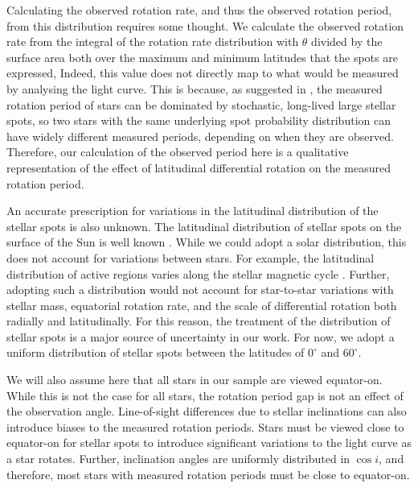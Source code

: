 Calculating the observed rotation rate, and thus the observed rotation period, from this distribution requires some thought.
We calculate the observed rotation rate from the integral of the rotation rate distribution with $\theta$ divided by the surface area both over the maximum and minimum latitudes that the spots are expressed,
Indeed, this value does not directly map to what would be measured by analysing the light curve. 
This is because, as suggested in \citet{aigrain_hare_2015}, the measured rotation period of stars can be dominated by stochastic, long-lived large stellar spots, so two stars with the same underlying spot probability distribution can have widely different measured periods, depending on when they are observed.
Therefore, our calculation of the observed period here is a qualitative representation of the effect of latitudinal differential rotation on the measured rotation period.

An accurate prescription for variations in the latitudinal distribution of the stellar spots is also unknown.
The latitudinal distribution of stellar spots on the surface of the Sun is well known \citep[see, e.g.,][]{maunder_note_1904,hathaway_solar_2015}.
While we could adopt a solar distribution, this does not account for variations between stars.
For example, the latitudinal distribution of active regions varies along the stellar magnetic cycle \citep[see, e.g.,][ and references therein]{grijs_stellar_2021}.
Further, adopting such a distribution would not account for star-to-star variations with stellar mass, equatorial rotation rate, and the scale of differential rotation both radially and latitudinally.
For this reason, the treatment of the distribution of stellar spots is a major source of uncertainty in our work.
For now, we adopt a uniform distribution of stellar spots between the latitudes of $0^{\circ}$ and $60^{\circ}$.

We will also assume here that all stars in our sample are viewed equator-on.
While this is not the case for all stars, the rotation period gap is not an effect of the observation angle.
Line-of-sight differences due to stellar inclinations can also introduce biases to the measured rotation periods.
Stars must be viewed close to equator-on for stellar spots to introduce significant variations to the light curve as a star rotates.
Further, inclination angles are uniformly distributed in $\cos{i}$, and therefore, most stars with measured rotation periods must be close to equator-on.

